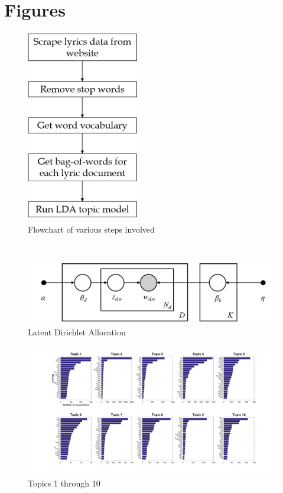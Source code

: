 \documentclass{article}
\begin{document}
  \section{Figures}
    \begin{figure}
      \begin{center}
      \includegraphics[width=5cm]{Flowchart.png}
      \end{center}
      \caption{Flowchart of various steps involved}
      \label{fig:flow}
    \end{figure}\\
    \begin{figure}
      \begin{center}
      \includegraphics[width=15cm]{LDAGraphicalModel.png}
      \end{center}
      \caption{Latent Dirichlet Allocation}
      \label{fig:lda}
    \end{figure}
    \begin{landscape}
      \begin{figure}
        \includegraphics[width=\linewidth]{AllTopics_1.png}
        \caption{Topics 1 through 10}
        \label{fig:t1Fig}
      \end{figure}
    \end{landscape}
\end{document}
